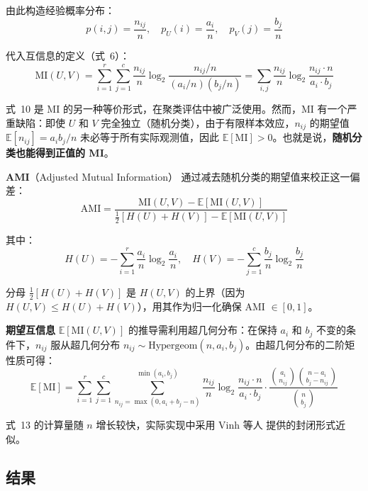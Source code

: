\documentclass[11pt,a4paper]{article}
\newcommand{\E}{\mathbb{E}}
\begin{document}
由此构造经验概率分布：
\[
p(i,j) = \frac{n_{ij}}{n},\quad
p_U(i) = \frac{a_i}{n},\quad
p_V(j) = \frac{b_j}{n}
\]

代入互信息的定义（式~6）：
\[
\text{MI}(U,V) = \sum_{i=1}^{r} \sum_{j=1}^{c} \frac{n_{ij}}{n} \log_2 \frac{n_{ij} / n}{(a_i/n)(b_j/n)}
            = \sum_{i,j} \frac{n_{ij}}{n} \log_2 \frac{n_{ij} \cdot n}{a_i \cdot b_j}
\tag{10}
\]

式~10 是 MI 的另一种等价形式，在聚类评估中被广泛使用。然而，MI 有一个严重缺陷：即使 $U$ 和 $V$ 完全独立（随机分类），由于有限样本效应，$n_{ij}$ 的期望值 $\E[n_{ij}] = a_i b_j / n$ 未必等于所有实际观测值，因此 $\E[\text{MI}] > 0$。也就是说，\textbf{随机分类也能得到正值的 MI}。

\textbf{AMI}（Adjusted Mutual Information）\cite{vinh2009} 通过减去随机分类的期望值来校正这一偏差：
\[
\text{AMI} = \frac{\text{MI}(U,V) - \E[\text{MI}(U,V)]}{\frac{1}{2}[H(U) + H(V)] - \E[\text{MI}(U,V)]}
\tag{11}
\]

其中：
\[
H(U) = -\sum_{i=1}^{r} \frac{a_i}{n} \log_2 \frac{a_i}{n}, \quad
H(V) = -\sum_{j=1}^{c} \frac{b_j}{n} \log_2 \frac{b_j}{n}
\tag{12}
\]

分母 $\frac{1}{2}[H(U) + H(V)]$ 是 $H(U,V)$ 的上界（因为 $H(U,V) \leq H(U) + H(V)$），用其作为归一化确保 AMI $\in [0,1]$。

\textbf{期望互信息} $\E[\text{MI}(U,V)]$ 的推导需利用超几何分布：在保持 $a_i$ 和 $b_j$ 不变的条件下，$n_{ij}$ 服从超几何分布 $n_{ij} \sim \text{Hypergeom}(n, a_i, b_j)$。由超几何分布的二阶矩性质可得：
\[
\E[\text{MI}] = \sum_{i=1}^{r} \sum_{j=1}^{c} \sum_{n_{ij} = \max(0, a_i+b_j-n)}^{\min(a_i, b_j)} \frac{n_{ij}}{n} \log_2 \frac{n_{ij} \cdot n}{a_i \cdot b_j} \cdot \frac{\binom{a_i}{n_{ij}}\binom{n-a_i}{b_j-n_{ij}}}{\binom{n}{b_j}}
\tag{13}
\]

式~13 的计算量随 $n$ 增长较快，实际实现中采用 Vinh 等人\cite{vinh2009} 提供的封闭形式近似。

\subsection{结果}
\end{document}

